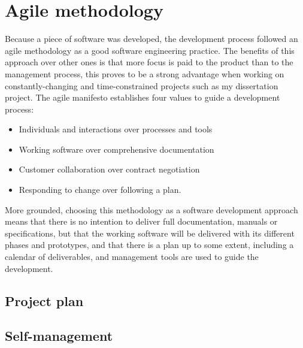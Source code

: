 \section{Agile methodology}
Because a piece of software was developed, the development process followed an agile methodology as a good software engineering practice. The benefits of this approach over other ones is that more focus is paid to the product than to the management process, this proves to be a strong advantage when working on constantly-changing and time-constrained projects such as my dissertation project.
The agile manifesto \cite{Martin2002} establishes four values to guide a development process: 
\begin{itemize}
  \item Individuals and interactions over processes and tools
  \item Working software over comprehensive documentation
  \item Customer collaboration over contract negotiation
  \item Responding to change over following a plan. 
\end{itemize}

More grounded, choosing this methodology as a software development approach means that there is no intention to deliver full documentation, manuals or specifications, but that the working software will be delivered with its different phases and prototypes, and that there is a plan up to some extent, including a calendar of deliverables, and management tools are used to guide the development.

\subsection{Project plan}

\subsection{Self-management}
